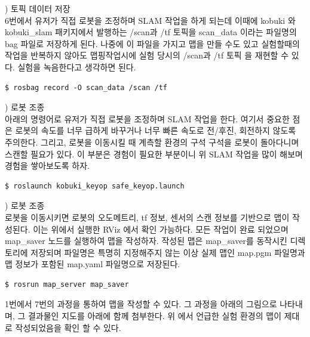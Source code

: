 \vspace{\baselineskip}
\noindent
{}
\thenum) 토픽 데이터 저장\\
6번에서 유저가 직접 로봇을 조정하며 SLAM 작업을 하게 되는데 이때에 kobuki 와 kobuki\_slam 패키지에서 발행하는 /scan과 /tf 토픽을 scan\_data 이라는 파일명의 bag 파일로 저장하게 된다. 나중에 이 파일을 가지고 맵을 만들 수도 있고 실험할때의 작업을 반복하지 않아도 맵핑작업시에 실험 당시의 /scan과 /tf 토픽 을 재현할 수 있다. 실험을 녹음한다고 생각하면 된다.

\vspace{\baselineskip}
\begin{lstlisting}[language=ROS]
$ rosbag record -O scan_data /scan /tf
\end{lstlisting}

\vspace{\baselineskip}
\noindent
{}
\thenum) 로봇 조종\\
아래의 명령어로 유저가 직접 로봇을 조정하며 SLAM 작업을 한다. 여기서 중요한 점은 로봇의 속도를 너무 급하게 바꾸거나 너무 빠른 속도로 전/후진, 회전하지 않도록 주의한다. 그리고, 로봇을 이동시킬 때 계측할 환경의 구석 구석을 로봇이 돌아다니며 스캔할 필요가 있다. 이 부분은 경험이 필요한 부분이니 위 SLAM 작업을 많이 해보며 경험을 쌓아보도록 하자. 

\vspace{\baselineskip}
\begin{lstlisting}[language=ROS]
$ roslaunch kobuki_keyop safe_keyop.launch
\end{lstlisting}

\vspace{\baselineskip}
\noindent
{}
\thenum) 로봇 조종\\
로봇을 이동시키면 로봇의 오도메트리, tf 정보, 센서의 스캔 정보를 기반으로 맵이 작성된다. 이는 위에서 실행한 RViz 에서 확인 가능하다. 모든 작업이 완료 되었으며 map\_saver 노드를 실행하여 맵을 작성하자. 작성된 맵은 map\_saver를 동작시킨 디렉토리에 저장되며 파일명은 특명히 지정해주지 않는 이상 실제 맵인 map.pgm 파일명과 맵 정보가 포함된 map.yaml 파일명으로 저장된다.
\vspace{\baselineskip}
\begin{lstlisting}[language=ROS]
$ rosrun map_server map_saver
\end{lstlisting}

1번에서 7번의 과정을 통하여 맵을 작성할 수 있다. 그 과정을 아래의 그림으로 나타내며, 그 결과물인 지도를 아래에 함께 첨부한다. 위 에서 언급한 실험 환경의 맵이 제대로 작성되었음을 확인 할 수 있다.

